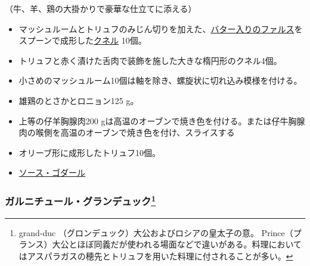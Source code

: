 \begin{recette}


（牛、羊、鶏の大掛かりで豪華な仕立てに添える）

\begin{itemize}
\item
  マッシュルームとトリュフのみじん切りを加えた、\protect\hyperlink{farce-a}{バター入りのファルス}をスプーンで成形した\protect\hyperlink{quenelles-diverses}{クネル}
  10個。
\item
  トリュフと赤く漬けた舌肉で装飾を施した大きな楕円形のクネル4個。
\item
  小さめのマッシュルーム10個は軸を除き、螺旋状に切れ込み模様を付ける。
\item
  雄鶏のとさかとロニョン125 g。
\item
  上等の仔羊胸腺肉200
  gは高温のオーブンで焼き色を付ける。または仔牛胸腺肉の喉側を高温のオーブンで焼き色を付け、スライスする
\item
  オリーブ形に成形したトリュフ10個。
\item
  \protect\hyperlink{sauce-godard}{ソース・ゴダール}
\end{itemize}

\atoaki{}

\hypertarget{garniture-grand-duc}{%
\subsubsection[ガルニチュール・グランデュック]{\texorpdfstring{ガルニチュール・グランデュック\footnote{grand-duc
  （グロンデュック）大公およびロシアの皇太子の意。
  Prince（プランス）大公とほぼ同義だが使われる場面などで違いがある。料理においてはアスパラガスの穂先とトリュフを用いた料理に付されることが多い。}}{ガルニチュール・グランデュック}}\label{garniture-grand-duc}}




\end{recette}
